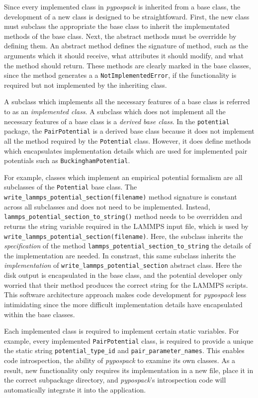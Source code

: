 Since every implemented class in \emph{pypospack} is inherited from a base class, the development of a new class is designed to be straightfoward.  First, the new class must subclass the appropriate the base class to inherit the implementated methods of the base class.  Next, the abstract methods must be overridde by defining them.   An abstract method defines the signature of method, such as the arguments which it should receive, what attributes it should modify, and what the method should return.  These methods are clearly marked in the base classes, since the method generates a  a \verb|NotImplementedError|, if the functionality is required but not implemented by the inheriting class.

A subclass which implements all the necessary features of a base class is referred to as an \emph{implemented class}.  A subclass which does not implement all the necessary features of a base class is a \emph{derived base class}.  In the \verb|potential| package, the \verb|PairPotential| is a derived base class because  it does not implement all the method required by the \verb|Potential| class.  However, it does define methods which encapsulates implementation details which are used for implemented pair potentials such as \verb|BuckinghamPotential|.

For example, classes which implement an empirical potential formalism are all subclasses of the \verb|Potential| base class.  The \verb|write_lammps_potential_section(filename)| method signature is constant across all subclasses and does not need to be implemented.
Instead, \verb|lammps_potential_section_to_string()| method needs to be overridden and returns the string variable required in the LAMMPS input file, which is used by \verb|write_lammps_potential_section(filename)|.
Here, the subclass inherits the \emph{specification} of the method \verb|lammps_potential_section_to_string| the details of the implementation are needed.  In constrast, this same subclass inherits the \emph{implementation}  of \verb|write_lammps_potential_section| abstract class.
Here the disk output is encapsulated in the base class, and the potential developer only worried that their method produces the correct string for the LAMMPS scripts.
This software architecture approach makes code development for \emph{pypospack} less intimidating since the more difficult implementation details have encapsulated within the base classes.

Each implemented class is required to implement certain static variables.  For example, every implemented \verb|PairPotential| class, is required to provide a unique the static string \verb|potential_type_id| and \verb|pair_parameter_names|.  This enables code introspection, the ability of \emph{pypospack} to examine its own classes.  As a result, new functionality only requires its implementation in a new file, place it in the correct subpackage directory, and \emph{pypospack}'s introspection code will automatically integrate it into the application.

